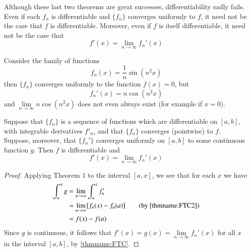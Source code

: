 \begin{rmk}
    Although these last two theorems are great successes, differentiability sadly fails. Even if each $f_n$ is differentiable and $\{f_n\}$ converges uniformly to $f$, it need not be the case that $f$ is differentiable. Moreover, even if $f$ is itself differentiable, it need not be the case that \begin{equation*}
        f'(x) = \lim\limits_{n\rightarrow \infty}f_n'(x)
    \end{equation*}
\end{rmk}

\begin{eg}
    Consider the family of functions \begin{equation*}
        f_n(x) = \frac{1}{n}\sin(n^2x)
    \end{equation*}
    then $\{f_n\}$ converges uniformly to the function $f(x) = 0$, but \begin{equation*}
        f_n'(x) = n\cos(n^2x)
    \end{equation*}
    and $\lim\limits_{n\rightarrow\infty}n\cos(n^2x)$ does not even always exist (for example if $x =0$).
\end{eg}


\begin{thm}
    Suppose that $\{f_n\}$ is a sequence of functions which are differentiable on $[a,b]$, with integrable derivatives $f'_n$, and that $\{f_n\}$ converges (pointwise) to $f$. Suppose, moreover, that $\{f_n'\}$ converges uniformly on $[a,b]$ to some continuous function $g$. Then $f$ is differentiable and \begin{equation*}
        f'(x) = \lim\limits_{n\rightarrow \infty}f_n'(x)
    \end{equation*}
\end{thm}
\begin{proof}
    Applying Theorem $1$ to the interval $[a,x]$, we see that for each $x$ we have \begin{align*}
        \int_a^xg &= \lim\limits_{n\rightarrow \infty}\int_a^xf'_n \\
        &= \lim\limits_{n\rightarrow \infty}[f_n(x) - f_n(a)] \tag{by \ref{thmname:FTC2}} \\
        &= f(x) - f(a)
    \end{align*}
    Since $g$ is continuous, it follows that $f'(x) = g(x) = \lim\limits_{n\rightarrow \infty}f_n'(x)$ for all $x$ in the interval $[a,b]$, by \ref{thmname:FTC}.
\end{proof}

